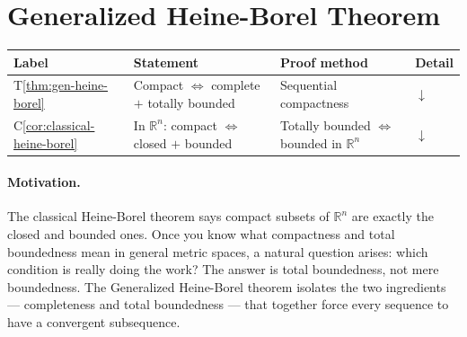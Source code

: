 %

\section{Generalized Heine-Borel Theorem}
\label{sec:generalized-heine-borel}

\begin{tcolorbox}[colback=gray!6, colframe=gray!40, arc=2pt,
  left=6pt, right=6pt, top=4pt, bottom=4pt,
  title={\small\textbf{Generalized Heine-Borel --- Quick Reference}},
  fonttitle=\small\bfseries]
\small
\begin{tabular}{l l l l}
\toprule
\textbf{Label} & \textbf{Statement} & \textbf{Proof method} & \textbf{Detail} \\
\midrule
T\ref{thm:gen-heine-borel}
  & Compact $\iff$ complete $+$ totally bounded
  & Sequential compactness
  & \hyperref[thm:gen-heine-borel]{$\downarrow$} \\[4pt]
C\ref{cor:classical-heine-borel}
  & In $\mathbb{R}^n$: compact $\iff$ closed $+$ bounded
  & Totally bounded $\iff$ bounded in $\mathbb{R}^n$
  & \hyperref[cor:classical-heine-borel]{$\downarrow$} \\[4pt]
\bottomrule
\end{tabular}
\end{tcolorbox}

\paragraph{Motivation.}
The classical Heine-Borel theorem says compact subsets of $\mathbb{R}^n$ are
exactly the closed and bounded ones.
Once you know what compactness and total boundedness mean in general metric
spaces, a natural question arises: which condition is really doing the work?
The answer is total boundedness, not mere boundedness.
The Generalized Heine-Borel theorem isolates the two ingredients ---
completeness and total boundedness --- that together force every sequence
to have a convergent subsequence.


